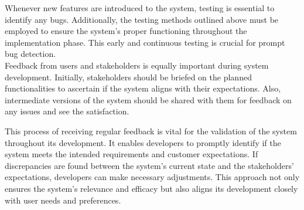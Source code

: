 \indent Whenever new features are introduced to the system, testing is essential to identify any bugs. Additionally, the testing methods outlined above must be employed to ensure the system's proper functioning throughout the implementation phase. This early and continuous testing is crucial for prompt bug detection.
\\
\indent Feedback from users and stakeholders is equally important during system development. Initially, stakeholders should be briefed on the planned functionalities to ascertain if the system aligns with their expectations. Also, intermediate versions of the system should be shared with them for feedback on any issues and see the satisfaction.

\indent This process of receiving regular feedback is vital for the validation of the system throughout its development. It enables developers to promptly identify if the system meets the intended requirements and customer expectations. If discrepancies are found between the system’s current state and the stakeholders' expectations, developers can make necessary adjustments. This approach not only ensures the system's relevance and efficacy but also aligns its development closely with user needs and preferences.